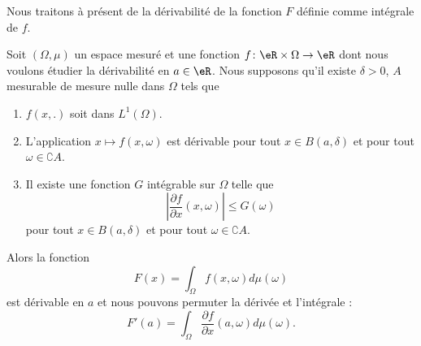 Nous traitons à présent de la dérivabilité de la fonction \( F\) définie comme intégrale de \( f\).

\begin{theorem}    \label{ThoMWpRKYp}
    Soit \( (\Omega,\mu)\) un espace mesuré et une fonction \( f\colon \eR\times \Omega\to \eR\) dont nous voulons étudier la dérivabilité en \(a\in \eR\). Nous supposons qu'il existe \( \delta>0\), \( A\) mesurable de mesure nulle dans \( \Omega\) tels que
    \begin{enumerate}
        \item
            \( f(x,.)\) soit dans \( L^1(\Omega)\).
        \item
            L'application \( x\mapsto f(x,\omega)\) est dérivable pour tout \( x\in B(a,\delta)\) et pour tout \( \omega\in \complement A\).
        \item
            Il existe une fonction \( G\) intégrable sur \( \Omega\) telle que
            \begin{equation}
                \left| \frac{ \partial f }{ \partial x }(x,\omega) \right| \leq G(\omega)
            \end{equation}
            pour tout \( x\in B(a,\delta)\) et pour tout \( \omega\in\complement A\).
    \end{enumerate}
    Alors la fonction
    \begin{equation}
        F(x)=\int_{\Omega}f(x,\omega)d\mu(\omega)
    \end{equation}
    est dérivable en \( a\) et nous pouvons permuter la dérivée et l'intégrale :
    \begin{equation}
        F'(a)=\int_{\Omega}\frac{ \partial f }{ \partial x }(a,\omega)d\mu(\omega).
    \end{equation}
\end{theorem}

